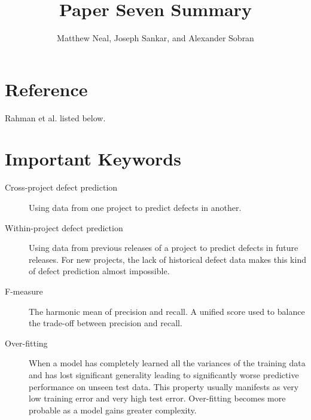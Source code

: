 \documentclass[english]{article}
\begin{document}
\title{Paper Seven Summary}


\author{Matthew Neal, Joseph Sankar, and Alexander Sobran}

\maketitle

\section*{Reference}

Rahman et al. \cite{Rahman} listed below.


\section*{Important Keywords}
\begin{description}
\item [{Cross-project defect prediction}] Using data from one project to predict defects in another.
\item [{Within-project defect prediction}] Using data from previous releases of a project to predict defects in future releases. For new projects, the lack of historical defect data makes this kind of defect prediction almost impossible.
\item[{F-measure}] The harmonic mean of precision and recall. A unified score used to balance the trade-off between precision and recall.
\item[{Over-fitting}] When a model has completely learned all the variances of the training data and has lost significant generality leading to significantly worse predictive performance on unseen test data. This property usually manifests as very low training error and very high test error. Over-fitting becomes more probable as a model gains greater complexity.

\end{description}
\end{document}
